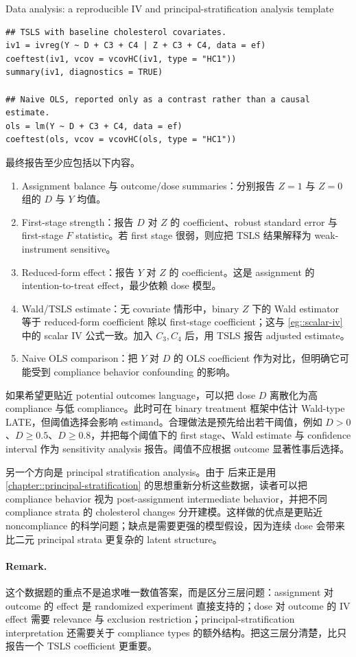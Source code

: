 \begin{exercisesolution}{Data analysis: \citet{efron1991compliance}}{a reproducible IV and principal-stratification analysis template}
\begin{lstlisting}
## TSLS with baseline cholesterol covariates.
iv1 = ivreg(Y ~ D + C3 + C4 | Z + C3 + C4, data = ef)
coeftest(iv1, vcov = vcovHC(iv1, type = "HC1"))
summary(iv1, diagnostics = TRUE)

## Naive OLS, reported only as a contrast rather than a causal estimate.
ols = lm(Y ~ D + C3 + C4, data = ef)
coeftest(ols, vcov = vcovHC(ols, type = "HC1"))
\end{lstlisting}

最终报告至少应包括以下内容。
\begin{enumerate}
\item
Assignment balance 与 outcome/dose summaries：分别报告 $Z=1$ 与 $Z=0$ 组的 $D$ 与 $Y$ 均值。
\item
First-stage strength：报告 $D$ 对 $Z$ 的 coefficient、robust standard error 与 first-stage $F$ statistic。若 first stage 很弱，则应把 TSLS 结果解释为 weak-instrument sensitive。
\item
Reduced-form effect：报告 $Y$ 对 $Z$ 的 coefficient。这是 assignment 的 intention-to-treat effect，最少依赖 dose 模型。
\item
Wald/TSLS estimate：无 covariate 情形中，binary $Z$ 下的 Wald estimator 等于 reduced-form coefficient 除以 first-stage coefficient；这与 \cref{eg::scalar-iv} 中的 scalar IV 公式一致。加入 $C_3,C_4$ 后，用 TSLS 报告 adjusted estimate。
\item
Naive OLS comparison：把 $Y$ 对 $D$ 的 OLS coefficient 作为对比，但明确它可能受到 compliance behavior confounding 的影响。
\end{enumerate}

如果希望更贴近 potential outcomes language，可以把 dose $D$ 离散化为高 compliance 与低 compliance。此时可在 binary treatment 框架中估计 Wald-type LATE，但阈值选择会影响 estimand。合理做法是预先给出若干阈值，例如 $D>0$、$D\geq 0.5$、$D\geq 0.8$，并把每个阈值下的 first stage、Wald estimate 与 confidence interval 作为 sensitivity analysis 报告。阈值不应根据 outcome 显著性事后选择。

另一个方向是 principal stratification analysis。由于 \citet{jin2008principal} 后来正是用 \cref{chapter::principal-stratification} 的思想重新分析这些数据，读者可以把 compliance behavior 视为 post-assignment intermediate behavior，并把不同 compliance strata 的 cholesterol changes 分开建模。这样做的优点是更贴近 noncompliance 的科学问题；缺点是需要更强的模型假设，因为连续 dose 会带来比二元 principal strata 更复杂的 latent structure。

\paragraph{Remark.}
这个数据题的重点不是追求唯一数值答案，而是区分三层问题：assignment 对 outcome 的 effect 是 randomized experiment 直接支持的；dose 对 outcome 的 IV effect 需要 relevance 与 exclusion restriction；principal-stratification interpretation 还需要关于 compliance types 的额外结构。把这三层分清楚，比只报告一个 TSLS coefficient 更重要。
\end{exercisesolution}
